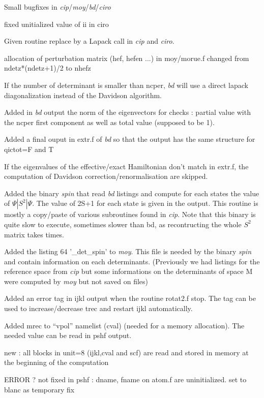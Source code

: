 \documentclass[a4paper,10pt]{article}
\begin{document}
\begin{description}
\item Small bugfixes in \textit{cip}/\textit{moy}/\textit{bd}/\textit{ciro}
\item fixed unitialized value of ii in ciro
\item Given routine replace by a Lapack call in \textit{cip} and \textit{ciro}.
\item allocation of perturbation matrix (hef, hefen ...) in moy/morue.f changed from ndetz*(ndetz+1)/2 to nhefz
\item If the number of determinant is smaller than ncper, \textit{bd} will use a direct lapack diagonalization instead of the Davidson algorithm.
\item Added in \textit{bd} output the norm of the eigenvectors for checks : partial value with the ncper first component as well as total value (supposed to be 1).
\item Added a final ouput in extr.f of \textit{bd} so that the output has the same structure for qictot=F and T
\item If the eigenvalues of the effective/exact Hamiltonian don't match in extr.f, the computation of Davidson correction/renormalisation are skipped.  
\item Added the binary \textit{spin} that read \textit{bd} listings and compute for each states the value of $\Psi | S^2 | \Psi$. The value of 2S+1 for each state is given in the output. This routine is mostly a copy/paste of various subroutines found in \textit{cip}. Note that this binary is quite slow to execute, sometimes slower than bd, as recontructing the whole $S^2$ matrix takes times. 
\item Added the listing 64 '\_det\_spin' to \textit{moy}. This file is needed by the binary \textit{spin} and contain information on each determinants. (Previously we had listings for the reference space from \textit{cip} but some informations on the determinants of space M were computed by \textit{moy} but not saved on files)
\item Added an error tag in ijkl output when the routine rotat2.f stop. The tag can be used to increase/decrease trec and restart ijkl automatically. 
\item Added mrec to ``vpol'' namelist (cval) (needed for a memory allocation). The needed value can be read in pshf output. 
\item new : all blocks in unit=8 (ijkl,cval and scf) are read and stored in memory at the beginning of the computation
\item ERROR ? not fixed in pshf : dname, fname on atom.f  are uninitialized. set to blanc as temporary fix

\end{description}
\end{document}
